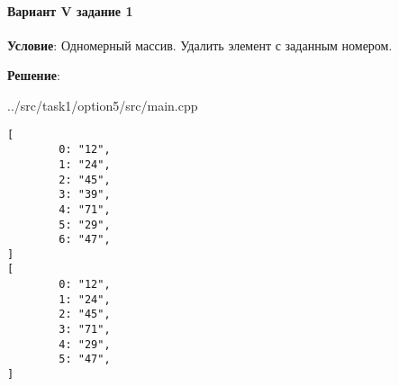 \paragraph{Вариант V задание 1} \hspace{0pt}

\textbf{Условие}:
Одномерный массив.
Удалить элемент с заданным номером.

\textbf{Решение}:


{../src/task1/option5/src/main.cpp}

\begin{lstlisting}[language=Out,]
[
        0: "12",
        1: "24",
        2: "45",
        3: "39",
        4: "71",
        5: "29",
        6: "47",
]
[
        0: "12",
        1: "24",
        2: "45",
        3: "71",
        4: "29",
        5: "47",
]
\end{lstlisting}
